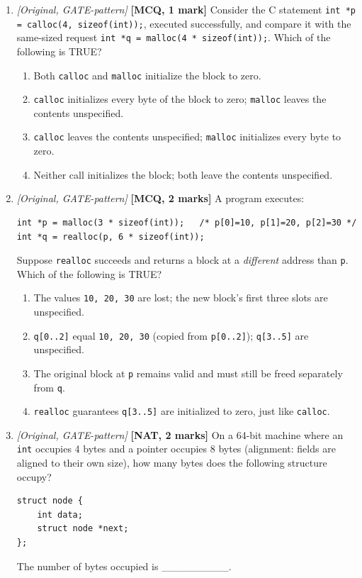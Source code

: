 \documentclass[11pt]{article}
\begin{document}
\begin{enumerate}
\item[\textbf{Q11}] \textit{[Original, GATE-pattern]} \textbf{[MCQ, 1 mark]} Consider the C statement \texttt{int *p = calloc(4, sizeof(int));}, executed successfully, and compare it with the same-sized request \texttt{int *q = malloc(4 * sizeof(int));}. Which of the following is TRUE?
\begin{enumerate}
  \item[(A)] Both \texttt{calloc} and \texttt{malloc} initialize the block to zero.
  \item[(B)] \texttt{calloc} initializes every byte of the block to zero; \texttt{malloc} leaves the contents unspecified.
  \item[(C)] \texttt{calloc} leaves the contents unspecified; \texttt{malloc} initializes every byte to zero.
  \item[(D)] Neither call initializes the block; both leave the contents unspecified.
\end{enumerate}

\item[\textbf{Q12}] \textit{[Original, GATE-pattern]} \textbf{[MCQ, 2 marks]} A program executes:
\begin{verbatim}
int *p = malloc(3 * sizeof(int));   /* p[0]=10, p[1]=20, p[2]=30 */
int *q = realloc(p, 6 * sizeof(int));
\end{verbatim}
Suppose \texttt{realloc} succeeds and returns a block at a \emph{different} address than \texttt{p}. Which of the following is TRUE?
\begin{enumerate}
  \item[(A)] The values \texttt{10, 20, 30} are lost; the new block's first three slots are unspecified.
  \item[(B)] \texttt{q[0..2]} equal \texttt{10, 20, 30} (copied from \texttt{p[0..2]}); \texttt{q[3..5]} are unspecified.
  \item[(C)] The original block at \texttt{p} remains valid and must still be freed separately from \texttt{q}.
  \item[(D)] \texttt{realloc} guarantees \texttt{q[3..5]} are initialized to zero, just like \texttt{calloc}.
\end{enumerate}

\item[\textbf{Q13}] \textit{[Original, GATE-pattern]} \textbf{[NAT, 2 marks]} On a 64-bit machine where an \texttt{int} occupies 4 bytes and a pointer occupies 8 bytes (alignment: fields are aligned to their own size), how many bytes does the following structure occupy?
\begin{verbatim}
struct node {
    int data;
    struct node *next;
};
\end{verbatim}
The number of bytes occupied is \_\_\_\_\_\_\_\_\_.


\end{enumerate}
\end{document}

